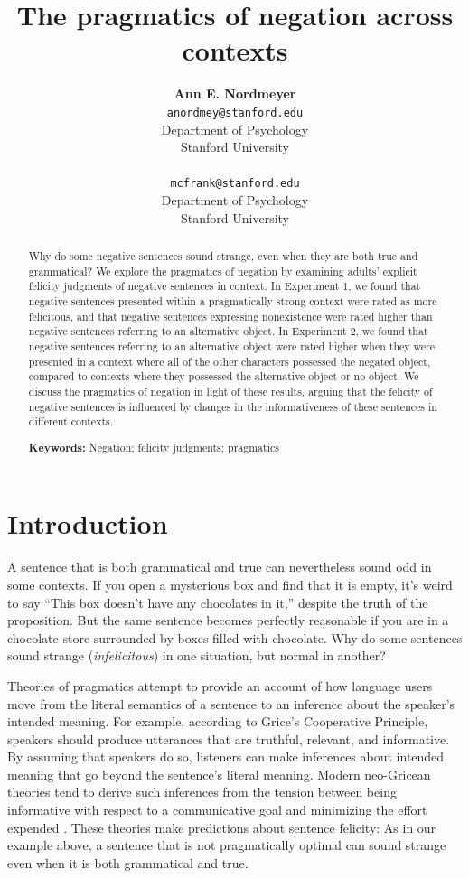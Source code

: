 \documentclass[10pt,letterpaper]{article}
\title{The pragmatics of negation across contexts}
\author{{\large \bf Ann E. Nordmeyer} \\ \texttt{anordmey@stanford.edu}\\ Department of Psychology \\ Stanford University \\ 
\And {\large \bf Michael C. Frank} \\ \texttt{mcfrank@stanford.edu} \\ Department of Psychology \\ Stanford University \\ }
\begin{document}
\maketitle


\begin{abstract}
Why do some negative sentences sound strange, even when they are both true and grammatical? We explore the pragmatics of negation by examining adults' explicit felicity judgments of negative sentences in context.  In Experiment 1, we found that negative sentences presented within a pragmatically strong context were rated as more felicitous, and that negative sentences expressing nonexistence were rated higher than negative sentences referring to an alternative object.  In Experiment 2, we found that negative sentences referring to an alternative object were rated higher when they were presented in a context where all of the other characters possessed the negated object, compared to contexts where they possessed the alternative object or no object.  We discuss the pragmatics of negation in light of these results, arguing that the felicity of negative sentences is influenced by changes in the informativeness of these sentences in different contexts. 

\textbf{Keywords:} 
Negation; felicity judgments; pragmatics
\end{abstract}

\section{Introduction}

A sentence that is both grammatical and true can nevertheless sound odd in some contexts. If you open a mysterious box and find that it is empty, it's weird to say ``This box doesn't have any chocolates in it,'' despite the truth of the proposition. But the same sentence becomes perfectly reasonable if you are in a chocolate store surrounded by boxes filled with chocolate.  Why do some sentences sound strange (\emph{infelicitous}) in one situation, but normal in another?

Theories of pragmatics attempt to provide an account of how language users move from the literal semantics of a sentence to an inference about the speaker's intended meaning. For example, according to Grice's \citeyear{grice1975} Cooperative Principle, speakers should produce utterances that are truthful, relevant, and informative.  By assuming that speakers do so, listeners can make inferences about intended meaning that go beyond the sentence's literal meaning. Modern neo-Gricean theories tend to derive such inferences from the tension between being informative with respect to a communicative goal and minimizing the effort expended \cite{horn1984,levinson2000,frank2012}. These theories make predictions about sentence felicity: As in our example above, a sentence that is not pragmatically optimal can sound strange even when it is both grammatical and true.
\end{document}
